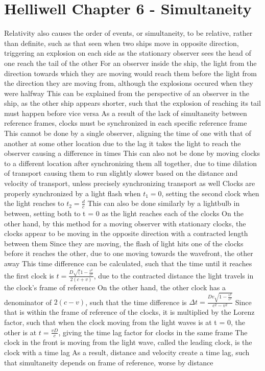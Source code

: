 \documentclass[11 pt, twoside]{article}
\newenvironment{outline*}
{
	\begin{outline}[enumerate]
	}
	{\end{outline}
}
\begin{document}
\section{Helliwell Chapter 6 - Simultaneity}
\begin{outline*}
\1 Relativity also causes the order of events, or simultaneity, to be relative, rather than definite, such as that seen when two ships move in opposite direction, triggering an explosion on each side as the stationary observer sees the head of one reach the tail of the other
\2 For an observer inside the ship, the light from the direction towards which they are moving would reach them before the light from the direction they are moving from, although the explosions occured when they were halfway
\2 This can be explained from the perspective of an observer in the ship, as the other ship appears shorter, such that the explosion of reaching its tail must happen before vice versa
\1 As a result of the lack of simultaneity between reference frames, clocks must be synchronized in each specific reference frame
\2 This cannot be done by a single observer, aligning the time of one with that of another at some other location due to the lag it takes the light to reach the observer causing a difference in times
\2 This can also not be done by moving clocks to a different location after synchronizing them all together, due to time dilation of transport causing them to run slightly slower based on the distance and velocity of transport, unless precisely synchronizing transport as well
\2 Clocks are properly synchronized by a light flash when $t_1 = 0$, setting the second clock when the light reaches to $t_2 = \frac{d}{c}$
\3 This can also be done similarly by a lightbulb in between, setting both to t = 0 as the light reaches each of the clocks
\2 On the other hand, by this method for a moving observer with stationary clocks, the clocks appear to be moving in the opposite direction with a contracted length between them
\3 Since they are moving, the flash of light hits one of the clocks before it reaches the other, due to one moving towards the wavefront, the other away
\3 This time difference can be calculated, such that the time until it reaches the first clock is $t = \frac{D\sqrt(1 - \frac{v^2}{c^2}}{2(c + v)}$, due to the contracted distance the light travels in the clock's frame of reference
\4 On the other hand, the other clock has a denominator of $2(c - v)$, such that the time difference is $\Delta t = \frac{Dv\sqrt{1 - \frac{v^2}{c^2}}}{c^2 - v^2}$
\4 Since that is within the frame of reference of the clocks, it is multiplied by the Lorenz factor, such that when the clock moving from the light waves is at t = 0, the other is at $t = \frac{vD}{c}$, giving the time lag factor for clocks in the same frame
\4 The clock in the front is moving from the light wave, called the leading clock, is the clock with a time lag
\3 As a result, distance and velocity create a time lag, such that simultaneity depends on frame of reference, worse by distance
\end{outline*}
\end{document}
